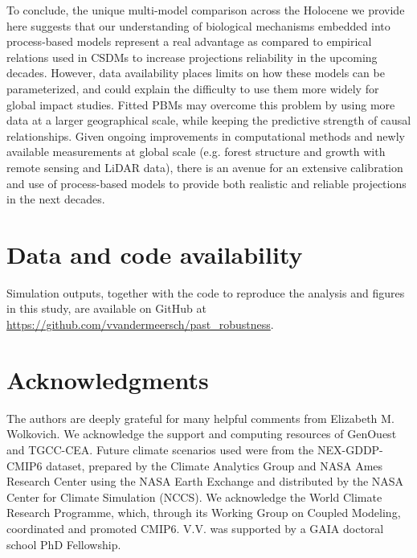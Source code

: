 \documentclass[pdflatex, sn-nature]{sn-jnl}%
\begin{document}
To conclude, the unique multi-model comparison across the Holocene we provide here suggests that our understanding of biological mechanisms embedded into process-based models represent a real advantage as compared to empirical relations used in CSDMs to increase projections reliability in the upcoming decades. However, data availability places limits on how these models can be parameterized, and could explain the difficulty to use them more widely for global impact studies. Fitted PBMs may overcome this problem by using more data at a larger geographical scale, while keeping the predictive strength of causal relationships. Given ongoing improvements in computational methods and newly available measurements at global scale (e.g. forest structure and growth with remote sensing and LiDAR data), there is an avenue for an extensive calibration and use of process-based models to provide both realistic and reliable projections in the next decades.

\backmatter

\section*{Data and code availability}

Simulation outputs, together with the code to reproduce the analysis and figures in this study, are available on GitHub at \url{https://github.com/vvandermeersch/past_robustness}.

\section*{Acknowledgments}

The authors are deeply grateful for many helpful comments from Elizabeth M. Wolkovich.
We acknowledge the support and computing resources of GenOuest and TGCC-CEA.
Future climate scenarios used were from the NEX-GDDP-CMIP6 dataset, prepared by the Climate Analytics Group and NASA Ames Research Center using the NASA Earth Exchange and distributed by the NASA Center for Climate Simulation (NCCS). We acknowledge the World Climate Research Programme, which, through its Working Group on
Coupled Modeling, coordinated and promoted CMIP6.
V.V. was supported by a GAIA doctoral school PhD Fellowship.
\end{document}

